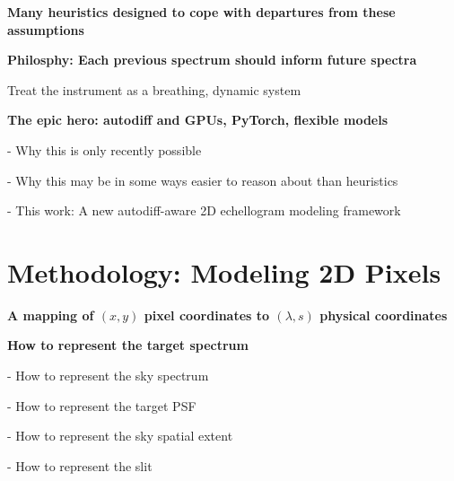 \documentclass[twocolumn]{aastex63}
\begin{document}
\begin{mdframed}
  \textbf{Many heuristics designed to cope with departures from these assumptions} \par
  \textcolor{lightgray}{\lipsum[4]}
\end{mdframed}

\begin{mdframed}
  \textbf{Philosphy: Each previous spectrum should inform future spectra} \par
  Treat the instrument as a breathing, dynamic system\par
  \textcolor{lightgray}{\lipsum[5]}
\end{mdframed}

\begin{mdframed}
  \textbf{The epic hero: autodiff and GPUs, PyTorch, flexible models} \par
  - Why this is only recently possible\par
  - Why this may be in some ways easier to reason about than heuristics\par
  - This work: A new autodiff-aware 2D echellogram modeling framework\par
  \textcolor{lightgray}{\lipsum[6]}
\end{mdframed}


\section{Methodology: Modeling 2D Pixels}

\begin{mdframed}
  \textbf{A mapping of $(x, y)$ pixel coordinates to $(\lambda, s)$ physical coordinates} \par
  \textcolor{lightgray}{\lipsum[7]}
\end{mdframed}

\begin{mdframed}
  \textbf{How to represent the target spectrum} \par
  - How to represent the sky spectrum\par
  - How to represent the target PSF\par
  - How to represent the sky spatial extent\par
  - How to represent the slit\par
\end{mdframed}
\end{document}
